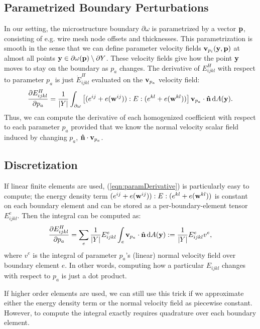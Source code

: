\documentclass[10pt]{article}
\providecommand{\dA}{\, \mathrm{d}A}
\providecommand{\pder}[2]{\frac{\partial #1}{\partial #2}}
\begin{document}
\subsection{Parametrized Boundary Perturbations}
In our setting, the microstructure boundary $\partial \omega$ is parametrized by a vector ${\bf p}$,
consisting of e.g. wire mesh node offsets and thicknesses. This parametrization is smooth
in the sense that we can define parameter velocity fields ${\bf v}_{p_i}({\bf y}, {\bf
p})$ at almost all points ${\bf y} \in \partial \omega({\bf p}) \setminus \partial Y$.
These velocity fields give how the point ${\bf y}$ moves to stay on the
boundary as $p_a$ changes. The derivative of $E^H_{ijkl}$ with respect to
parameter $p_a$ is just $\dot{E}^H_{ijkl}$ evaluated on the ${\bf v}_{p_a}$
velocity field:
\begin{equation}
\label{eqn:paramDerivative}
\pder{E^H_{ijkl}}{p_a} =
\frac{1}{|Y|} \int_{\partial \omega} \left[(e^{ij} + e({\bf w}^{ij})) : E : (e^{kl} + e({\bf w}^{kl}))\right] {\bf v}_{p_a} \cdot {\bf \hat{n}} \dA({\bf y}).
\end{equation}
Thus, we can compute the derivative of each homogenized coefficient with
respect to each parameter $p_a$ provided that we know the normal velocity
scalar field induced by changing $p_a$, ${\bf \hat{n}} \cdot {\bf v}_{p_a}$.

\subsection{Discretization}
If linear finite elements are used, (\ref{eqn:paramDerivative}) is
particularly easy to compute; the energy density term
$(e^{ij} + e({\bf w}^{ij})) : E : (e^{kl} + e({\bf w}^{kl}))$
is constant on each boundary element and can be stored as a per-boundary-element tensor $E^e_{ijkl}$.
Then the integral can be computed as:
$$
\pder{E^H_{ijkl}}{p_a} =
\sum_e \frac{1}{|Y|} E^e_{ijkl} \int_e {\bf v}_{p_a} \cdot \hat{{\bf n}} \dA({\bf y}) := \frac{1}{|Y|} E^e_{ijkl} v^e,
$$
where $v^e$ is the integral of parameter $p_a$'s (linear) normal velocity field
over boundary element $e$. In other words, computing how a particular
$E_{ijkl}$ changes with respect to $p_a$ is just a dot product.

If higher order elements are used, we can still use this trick if we
approximate either the energy density term or the normal velocity field as
piecewise constant. However, to compute the integral exactly requires
quadrature over each boundary element.
\end{document}
